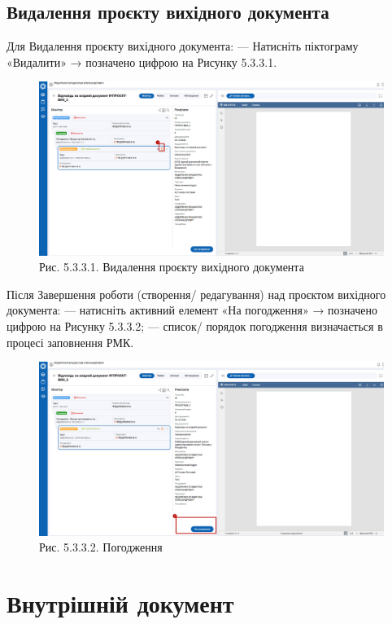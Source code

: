 \subsection{Видалення проєкту вихідного документа}

Для Видалення проєкту вихідного документа:
--- Натисніть піктограму «Видалити» → позначено цифрою  на Рисунку 5.3.3.1.

\begin{figure}[!htbp]
\centerline{\includegraphics[width=\textwidth]{img/5.3.3.1.png}}
\caption{Рис. 5.3.3.1. Видалення проєкту вихідного документа}
\end{figure}

Після Завершення роботи (створення/ редагування) над проєктом вихідного документа:
--- натисніть активний елемент «На погодження» → позначено цифрою  на Рисунку 5.3.3.2;
--- список/ порядок погодження визначається в процесі заповнення РМК.

\begin{figure}[!htbp]
\centerline{\includegraphics[width=\textwidth]{img/5.3.3.2.png}}
\caption{Рис. 5.3.3.2. Погодження}
\end{figure}

\section{Внутрішній документ}

